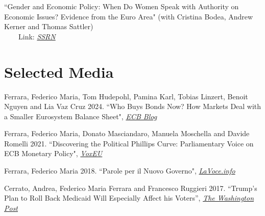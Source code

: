 \documentclass[margin, line]{res}
\begin{document}
\begin{resume}
``Gender and Economic Policy: When Do Women Speak with Authority on Economic Issues? Evidence from the Euro Area" (with Cristina Bodea, Andrew Kerner and Thomas Sattler) \\ \-\ \-\ \-\ \-\ Link: \href{https://papers.ssrn.com/sol3/papers.cfm?abstract_id=3881069}{\textit{SSRN}}




\section{\sc Selected Media}

\begin{hangparas}{0.17in}{1}
Ferrara, Federico Maria, Tom Hudepohl, Pamina Karl, Tobias Linzert, Benoit Nguyen and Lia Vaz Cruz 2024. ``Who Buys Bonds Now? How Markets Deal with a Smaller Eurosystem Balance Sheet", \href{https://www.ecb.europa.eu/press/blog/date/2024/html/ecb.blog20240322~54dcd060b1.en.html}{\textit{ECB Blog}}
\end{hangparas}

\begin{hangparas}{0.17in}{1}
Ferrara, Federico Maria, Donato Masciandaro, Manuela Moschella and Davide Romelli 2021. ``Discovering the Political Phillips Curve: Parliamentary Voice on ECB Monetary Policy", \href{https://voxeu.org/article/parliamentary-voice-ecb-monetary-policy}{\textit{VoxEU}}
\end{hangparas}

\begin{hangparas}{0.17in}{1}
Ferrara, Federico Maria 2018. ``Parole per il Nuovo Governo", \href{http://www.lavoce.info/archives/53204/parole-per-il-nuovo-governo/}{\textit{LaVoce.info}}
\end{hangparas}

\begin{hangparas}{0.17in}{1}
Cerrato, Andrea, Federico Maria Ferrara and Francesco Ruggieri 2017. ``Trump's Plan to Roll Back Medicaid Will Especially Affect his Voters'', \href{https://www.washingtonpost.com/news/monkey-cage/wp/2017/01/27/trumps-plan-to-roll-back-medicaid-will-especially-affect-his-voters/?postshare=8441485518767960&tid=ss_fb&utm_term=.80aa3b3c2256}{\textit{The Washington Post}}
\end{hangparas}


\end{resume}
\end{document}
